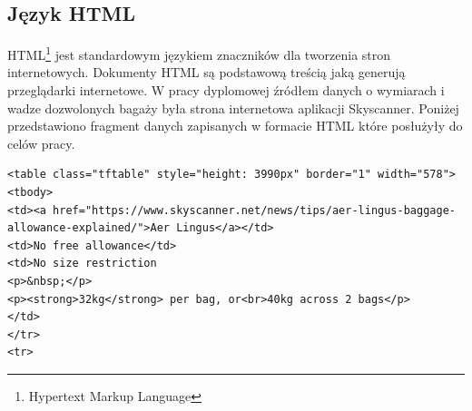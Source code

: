 \documentclass[12pt, twoside]{report}
\begin{document}
\subsection{Język HTML}
HTML\footnote{Hypertext Markup Language} jest standardowym językiem znaczników dla tworzenia stron internetowych\cite{html}. Dokumenty HTML są podstawową treścią jaką generują przeglądarki internetowe. W pracy dyplomowej źródłem danych o wymiarach i wadze dozwolonych bagaży była strona internetowa aplikacji Skyscanner. Poniżej przedstawiono fragment danych zapisanych w formacie HTML które posłużyły do celów pracy.
\begin{lstlisting}[language=HTML5, caption= Fragment dokumentu HTML]
<table class="tftable" style="height: 3990px" border="1" width="578">
<tbody>
<td><a href="https://www.skyscanner.net/news/tips/aer-lingus-baggage-allowance-explained/">Aer Lingus</a></td>
<td>No free allowance</td>
<td>No size restriction
<p>&nbsp;</p>
<p><strong>32kg</strong> per bag, or<br>40kg across 2 bags</p>
</td>
</tr>
<tr>
\end{lstlisting}

\newpage
\end{document}
